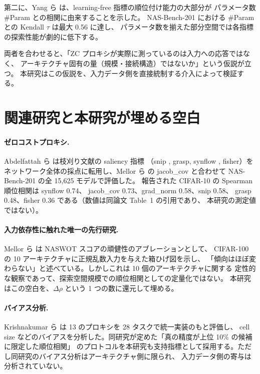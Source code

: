 \documentclass[11pt]{article}
\providecommand{\unverified}[1]{#1}
\begin{document}
第二に、Yang ら \cite{yang2023revisiting} は、learning-free 指標の順位付け能力の大部分が
パラメータ数 \#Param との相関に由来することを示した。
NAS-Bench-201 における \#Param との Kendall $\tau$ は最大 \unverified{0.56} に達し、
パラメータ数を揃えた部分空間では各指標の探索性能が劇的に低下する。

両者を合わせると、「ZC プロキシが実際に測っているのは入力への応答ではなく、
アーキテクチャ固有の量（規模・接続構造）ではないか」という仮説が立つ。
本研究はこの仮説を、入力データ側を直接統制する介入によって検証する。

\section{関連研究と本研究が埋める空白}

\paragraph{ゼロコストプロキシ.}
Abdelfattah ら \cite{abdelfattah2021zerocost} は枝刈り文献の saliency 指標
（snip \cite{lee2019snip}, grasp, synflow \cite{tanaka2020synflow}, fisher）を
ネットワーク全体の採点に転用し、Mellor ら \cite{mellor2021naswot} の jacob\_cov と合わせて
NAS-Bench-201 の全 15{,}625 モデルで評価した。
報告された CIFAR-10 の Spearman 順位相関は synflow \unverified{0.74}、
jacob\_cov \unverified{0.73}、grad\_norm \unverified{0.58}、snip \unverified{0.58}、
grasp \unverified{0.48}、fisher \unverified{0.36} である（数値は同論文 Table~1 の引用であり、
本研究の測定値ではない）。

\paragraph{入力依存性に触れた唯一の先行研究.}
Mellor ら \cite{mellor2021naswot} は NASWOT スコアの頑健性のアブレーションとして、
CIFAR-100 の 10 アーキテクチャに正規乱数入力を与えた箱ひげ図を示し、
「傾向はほぼ変わらない」と述べている。しかしこれは 10 個のアーキテクチャに関する
定性的な観察であって、探索空間規模での順位相関としての定量化ではない。
本研究はこの空白を、$\Delta\rho$ という 1 つの数に還元して埋める。

\paragraph{バイアス分析.}
Krishnakumar ら \cite{krishnakumar2022nbsz} は 13 のプロキシを 28 タスクで統一実装のもと評価し、
cell size などのバイアスを分析した。同研究が定めた「真の精度が上位 10\% の候補に限定した順位相関」
のプロトコルを本研究も支持指標として採用する。ただし同研究のバイアス分析はアーキテクチャ側に限られ、
入力データ側の寄与は分析されていない。
\end{document}
